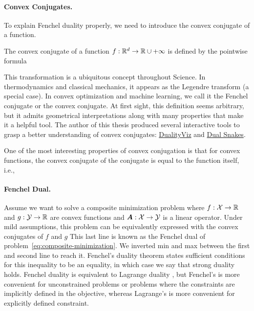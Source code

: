 \paragraph{Convex Conjugates.}
To explain Fenchel duality properly, we need to introduce the convex conjugate of a function.
\begin{definition}
	The convex conjugate of a function $f:\mathbb{R}^d \rightarrow \mathbb{R}\cup{+\infty}$ is defined by the pointwise formula
\end{definition}
This transformation is a ubiquitous concept throughout Science.
In thermodynamics and classical mechanics, it appears as the Legendre transform (a special case). In convex optimization and machine learning, we call it the Fenchel conjugate or the convex conjugate.
At first sight, this definition seems arbitrary, but it admits geometrical interpretations along with many properties that make it a helpful tool.
The author of this thesis produced several interactive tools to grasp a better understanding of convex conjugates: \href{https://remilepriol.github.io/dualityviz/}{DualityViz} and \href{https://remilepriol.github.io/dualityviz/dual_snakes.html}{Dual Snakes}.

One of the most interesting properties of convex conjugation is that for convex functions, the convex conjugate of the conjugate is equal to the function itself, i.e.,

\paragraph{Fenchel Dual.}
Assume we want to solve a composite minimization problem
where $f:{\mathcal X} \rightarrow\mathbb{R}$ and $g:{\mathcal Y} \rightarrow \mathbb{R}$ are convex functions and ${\bm{A}}: {\mathcal X} \rightarrow {\mathcal Y}$ is a linear operator.
Under mild assumptions, this problem can be equivalently expressed with the convex conjugates of $f$ and $g$
This last line is known as the Fenchel dual of problem~\eqref{eq:composite-minimization}.
We inverted min and max between the first and second line to reach it.
Fenchel's duality theorem states sufficient conditions for this inequality to be an equality, in which case we say that strong duality holds.
Fenchel duality is equivalent to Lagrange duality \citep{magnanti1974fenchel}, but Fenchel's is more convenient for unconstrained problems or problems where the constraints are implicitly defined in the objective, whereas Lagrange's is more convenient for explicitly defined constraint.

